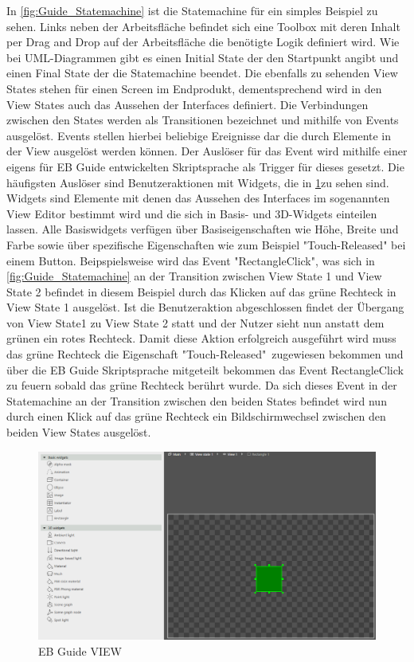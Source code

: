 In \cref{fig:Guide_Statemachine} ist die Statemachine für ein simples Beispiel zu sehen.
Links neben der Arbeitsfläche befindet sich eine Toolbox mit deren Inhalt per Drag and Drop auf der Arbeitsfläche die benötigte Logik definiert wird.
Wie bei UML-Diagrammen gibt es einen Initial State der den Startpunkt angibt und einen Final State der die Statemachine beendet.
Die ebenfalls zu sehenden View States stehen für einen Screen im Endprodukt, dementsprechend wird in den View States auch das Aussehen der Interfaces definiert.
Die Verbindungen zwischen den States werden als Transitionen bezeichnet und mithilfe von Events ausgelöst.
Events stellen hierbei beliebige Ereignisse dar die durch Elemente in der View ausgelöst werden können.
Der Auslöser für das Event wird mithilfe einer eigens für EB Guide entwickelten Skriptsprache als Trigger für dieses gesetzt.
Die häufigsten Auslöser sind Benutzeraktionen mit Widgets, die in \cref{fig:Guide_View}zu sehen sind.
Widgets sind Elemente mit denen das Aussehen des Interfaces im sogenannten View Editor bestimmt wird und die sich in Basis- und 3D-Widgets einteilen lassen.
Alle Basiswidgets verfügen über Basiseigenschaften wie Höhe, Breite und Farbe sowie über spezifische Eigenschaften wie zum Beispiel "Touch-Released" bei einem Button.\cite{studio_guide}
Beipspielsweise wird das Event "RectangleClick", was sich in \cref{fig:Guide_Statemachine} an der Transition zwischen View State 1 und View State 2 befindet in diesem Beispiel durch das Klicken auf das grüne Rechteck in View State 1 ausgelöst.
Ist die Benutzeraktion abgeschlossen findet der Übergang von View State1 zu View State 2 statt und der Nutzer sieht nun anstatt dem grünen ein rotes Rechteck.
Damit diese Aktion erfolgreich ausgeführt wird muss das grüne Rechteck die Eigenschaft "Touch-Released"\ zugewiesen bekommen und über die EB Guide Skriptsprache mitgeteilt bekommen das Event RectangleClick zu feuern sobald das grüne Rechteck berührt wurde.
Da sich dieses Event in der Statemachine an der Transition zwischen den beiden States befindet wird nun durch einen Klick auf das grüne Rechteck ein Bildschirmwechsel zwischen den beiden View States ausgelöst.

\begin{figure}[!h]
\begin{center}
  \includegraphics[scale=0.4]{figures/Guide_View.PNG}
  \caption{EB Guide VIEW}
  \label{fig:Guide_View}
\end{center}
\end{figure}


